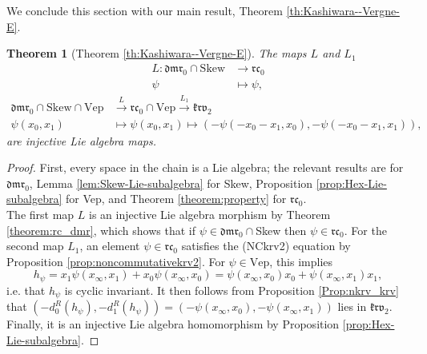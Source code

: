 \documentclass[a4paper,fleqn]{cas-sc}
\newtheorem{theorem}{Theorem}
\newcommand{\rc}{\mathfrak{rc}}
\newcommand{\dmr}{\mathfrak{dmr}}
\begin{document}
We conclude this section with our main result, Theorem \ref{th:Kashiwara--Vergne-E}.
\begin{theorem}[Theorem \ref{th:Kashiwara--Vergne-E}]
\label{th:Kashiwara--Vergne}
The maps $L$ and $L_1$
\begin{align*}
        L: \mathfrak{dmr}_0 \cap \mathrm{Skew} & \to \mathfrak{rc}_0\\
        \psi & \mapsto \psi,
    \end{align*}
\begin{align*}
\mathfrak{dmr}_0\cap \mathrm{Skew}\cap\mathrm{Vep}&\xrightarrow{L} \mathfrak{rc}_0\cap \mathrm{Vep}\xrightarrow{L_1} \mathfrak{krv}_2&\\
\psi(x_0,x_1)&\mapsto \psi(x_0,x_1)\mapsto (-\psi(-x_0-x_1, x_0), -\psi(-x_0-x_1, x_1)),
\end{align*}
are injective Lie algebra maps.

\end{theorem}

\begin{proof}

First, every space in the chain is a Lie algebra; the relevant results are \cite{Racinet2002} for $\dmr_0$, Lemma \ref{lem:Skew-Lie-subalgebra} for Skew, Proposition \ref{prop:Hex-Lie-subalgebra} for Vep, and Theorem \ref{theorem:property} for $\rc_0$. \\



The first map $L$ %
is an injective Lie algebra morphism by Theorem \ref{theorem:rc_dmr}, which shows that if $\psi \in \mathfrak{dmr}_0\cap$Skew then $\psi\in \mathfrak{rc}_0$. %
For the second map $L_1$, an element $\psi \in \mathfrak{rc}_0$ satisfies the (NCkrv2) equation by Proposition \ref{prop:noncommutativekrv2}. For $\psi\in \mathrm{Vep}$, this implies
\begin{equation*}
    h_{\psi}=x_1\psi(x_{\infty},x_1)+x_0\psi(x_{\infty},x_0)=\psi(x_{\infty},x_0)x_0+\psi(x_{\infty},x_1)x_1,
\end{equation*}
i.e. that $h_{\psi}$ is cyclic invariant. It then follows from Proposition \ref{Prop:nkrv_krv} that $(-d^R_0(h_{\psi}),-d^R_1(h_{\psi}))=(-\psi(x_{\infty},x_0),-\psi(x_{\infty},x_1))$ lies in $\mathfrak{krv}_2$. Finally, it is an injective Lie algebra homomorphism by Proposition \ref{prop:Hex-Lie-subalgebra}.

\end{proof}



%





\end{document}

